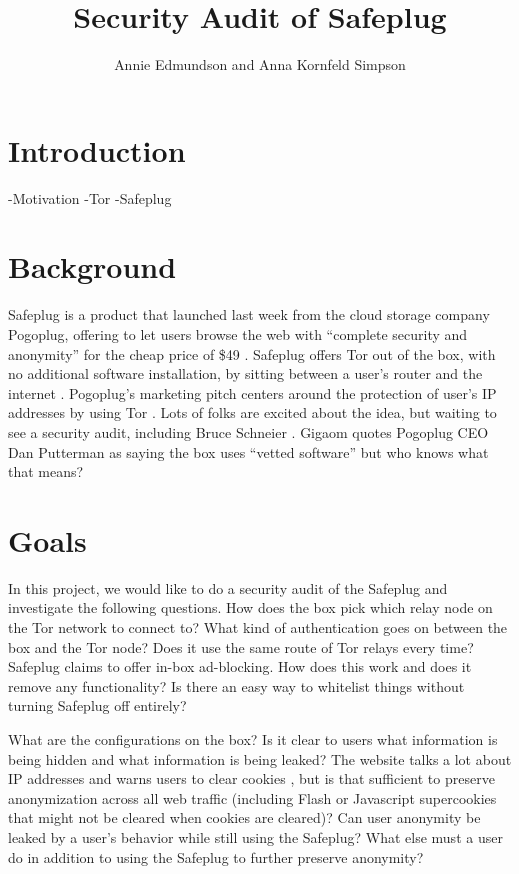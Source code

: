 \documentclass[12pt, letterpaper]{article}
\title{Security Audit of Safeplug}
\author{Annie Edmundson and Anna Kornfeld Simpson}
\begin{document}
\maketitle

\section{Introduction}
    -Motivation
    -Tor
    -Safeplug

\section{Background}
Safeplug is a product that launched last week from the cloud storage company Pogoplug, offering to let users browse the web with “complete security and anonymity” for the cheap price of \$49 \cite{safeplug}.  Safeplug offers Tor out of the box, with no additional software installation, by sitting between a user’s router and the internet \cite{wired}.  Pogoplug’s marketing pitch centers around the protection of user’s IP addresses by using Tor \cite{safeplug,bittech}.  Lots of folks are excited about the idea, but waiting to see a security audit, including Bruce Schneier \cite{schneier}.  Gigaom quotes Pogoplug CEO Dan Putterman as saying the box uses “vetted software” \cite{gigaom} but who knows what that means?

\section{Goals}
In this project, we would like to do a security audit of the Safeplug and investigate the following questions.  How does the box pick which relay node on the Tor network to connect to?  What kind of authentication goes on between the box and the Tor node?  Does it use the same route of Tor relays every time?
Safeplug claims to offer in-box ad-blocking.  How does this work and does it remove any functionality?  Is there an easy way to whitelist things without turning Safeplug off entirely?

What are the configurations on the box?  Is it clear to users what information is being hidden and what information is being leaked?  The website talks a lot about IP addresses and warns users to clear cookies \cite{safeplug}, but is that sufficient to preserve anonymization across all web traffic (including Flash or Javascript supercookies that might not be cleared when cookies are cleared)?  Can user anonymity be leaked by a user’s behavior while still using the Safeplug?  What else must a user do in addition to using the Safeplug to further preserve anonymity?
\end{document}
